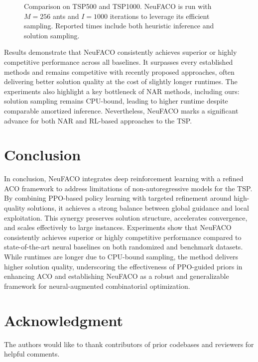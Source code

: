 \documentclass[a4paper,conference]{IEEEtran}
\begin{document}
\begin{figure}[!tb]
{\begin{tabular}{l ccc ccc}
\bottomrule[1pt]
\end{tabular}
}%

\caption{Comparison on TSP500 and TSP1000. NeuFACO is run with $M=256$ ants and $I=1000$ iterations to leverage its efficient sampling. Reported times include both heuristic inference and solution sampling.}
\label{fig:tsp-results}
\end{figure}

Results demonstrate that NeuFACO consistently achieves superior or highly competitive performance across all baselines. It surpasses every established methods and remains competitive with recently proposed approaches, often delivering better solution quality at the cost of slightly longer runtimes. The experiments also highlight a key bottleneck of NAR methods, including ours: solution sampling remains CPU-bound, leading to higher runtime despite comparable amortized inference. Nevertheless, NeuFACO marks a significant advance for both NAR and RL-based approaches to the TSP.

\section{Conclusion}
In conclusion, NeuFACO integrates deep reinforcement learning with a refined ACO framework to address limitations of non-autoregressive models for the TSP. By combining PPO-based policy learning with targeted refinement around high-quality solutions, it achieves a strong balance between global guidance and local exploitation. This synergy preserves solution structure, accelerates convergence, and scales effectively to large instances. Experiments show that NeuFACO consistently achieves superior or highly competitive performance compared to state-of-the-art neural baselines on both randomized and benchmark datasets. While runtimes are longer due to CPU-bound sampling, the method delivers higher solution quality, underscoring the effectiveness of PPO-guided priors in enhancing ACO and establishing NeuFACO as a robust and generalizable framework for neural-augmented combinatorial optimization.

\section*{Acknowledgment}
The authors would like to thank contributors of prior codebases and reviewers for helpful comments.



\end{document}
